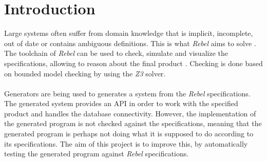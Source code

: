 \chapter{Introduction}
\label{chp:intro}
Large systems often suffer from domain knowledge that is implicit, incomplete,
out of date or contains ambiguous definitions. This is what \textit{Rebel} aims
to solve \cite{stoel2016solving}. The toolchain of \textit{Rebel} can be used to
check, simulate and visualize the specifications, allowing to reason about the
final product \cite{stoelcase}. Checking is done based on bounded model checking
by using the \textit{Z3} solver.\\
\\
Generators are being used to generates a system from the \textit{Rebel}
specifications. The generated system provides an API in order to work with the
specified product and handles the database connectivity. However, the
implementation of the generated program is not checked against the
specifications, meaning that the generated program is perhaps not doing what it
is supposed to do according to its specifications. The aim of this project is to
improve this, by automatically testing the generated program against
\textit{Rebel} specifications.


